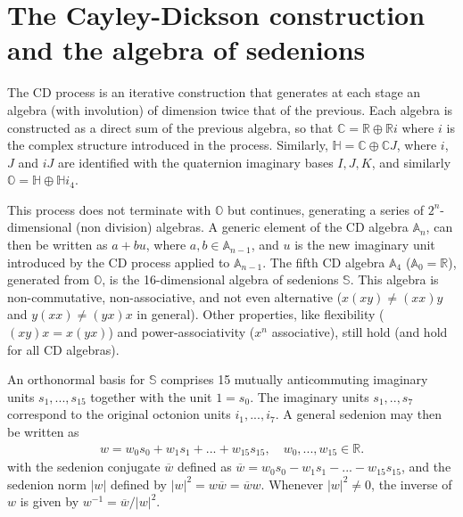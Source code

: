 \documentclass{article}
\newcommand{\bb}[1]{\mathbb{#1}}
\begin{document}
\section{The Cayley-Dickson construction and the algebra of sedenions}\label{sedenions}


The CD process is an iterative construction that generates at each stage an algebra (with involution) of dimension twice that of the previous. Each algebra is constructed as a direct sum of the previous algebra, so that $\bb{C}=\bb{R}\oplus\bb{R}i$ where $i$ is the complex structure introduced in the process. Similarly, $\bb{H} = \bb{C} \oplus \bb{C} J$, where $i$, $J$ and $iJ$ are identified with the quaternion imaginary bases $I, J, K$, and  similarly $\bb{O} = \bb{H}\oplus\bb{H}i_4$. 

This process does not terminate with $\bb{O}$ but continues, generating a series of $2^n$-dimensional (non division) algebras. A generic element of the CD algebra $\bb{A}_n$, can then  be written as $a+bu$, where $a,b \in \bb{A}_{n-1}$, and $u$ is the new imaginary unit introduced by the CD process applied to $\bb{A}_{n-1}$. The fifth CD algebra $\bb{A}_{4}$ ($\bb{A}_{0}=\bb{R}$), generated from $\bb{O}$, is the 16-dimensional algebra of sedenions $\bb{S}$. This algebra is non-commutative, non-associative, and not even alternative ($x(xy) \neq (xx)y$ and $y(xx) \neq (yx)x$ in general). Other properties, like flexibility ($(xy)x = x(yx)$) and power-associativity ($x^n$ associative), still hold (and hold for all CD algebras). 

An orthonormal basis for $\mathbb{S}$ comprises 15 mutually anticommuting imaginary units $s_1,...,s_{15}$ together with the unit $1=s_0$. The imaginary units $s_1,..,s_7$ correspond to the original octonion units $i_1,...,i_7$. A general sedenion may then be written as
\begin{eqnarray}
    w=w_0s_0+w_1s_1+...+w_{15}s_{15},\quad w_0,...,w_{15}\in\bb{R}.
\end{eqnarray}
with the sedenion conjugate $\overline{w}$ defined as $\overline{w}=w_0s_0-w_1s_1-...-w_{15}s_{15}$, and the sedenion norm $\vert w\vert$ defined by $\vert w\vert ^2=w\overline{w}=\overline{w}w$. Whenever $\vert w\vert ^2\neq 0$, the inverse of $w$ is given by $w^{-1}=\overline{w}/\vert w \vert^2$.
\end{document}
